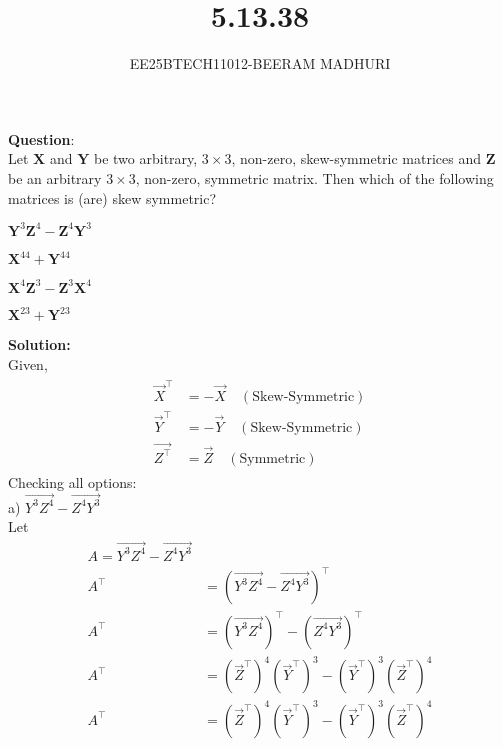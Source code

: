 \documentclass[journal]{IEEEtran}
\begin{document}

\vspace{3cm}

\title{5.13.38}
\author{EE25BTECH11012-BEERAM MADHURI}
{\let\newpage\relax\maketitle}

\renewcommand{\thefigure}{\theenumi}
\renewcommand{\thetable}{\theenumi}
\setlength{\intextsep}{10pt} %


\renewcommand{\thetable}{\theenumi}


\textbf{Question}:\\
Let $\mathbf{X}$ and $\mathbf{Y}$ be two arbitrary, $3 \times 3$, non-zero, skew-symmetric matrices and $\mathbf{Z}$ be an arbitrary $3 \times 3$, non-zero, symmetric matrix. Then which of the following matrices is (are) skew symmetric?

\begin{enumerate}
\begin{multicols}{4}
    \item $\mathbf{Y}^3 \mathbf{Z}^4 - \mathbf{Z}^4 \mathbf{Y}^3$
    \item $\mathbf{X}^{44} + \mathbf{Y}^{44}$
    \item $\mathbf{X}^4 \mathbf{Z}^3 - \mathbf{Z}^3 \mathbf{X}^4$
    \item $\mathbf{X}^{23} + \mathbf{Y}^{23}$
\end{multicols}
\end{enumerate}

\textbf{Solution:}\\
Given,
\begin{align}
\begin{aligned}\vec{X}^\top &= -\vec{X} \quad (\text{Skew-Symmetric}) \\\vec{Y}^\top &= -\vec{Y} \quad (\text{Skew-Symmetric}) \\\vec{Z^\top} &= \vec{Z} \quad (\text{Symmetric})\end{aligned}
\end{align}
Checking all options:\\
a) $\vec{Y^3 Z^4} - \vec{Z^4 Y^3}$\\
Let 
\begin{align}
A = \vec{Y^3 Z^4} - \vec{Z^4 Y^3}\\
A^\top &= (\vec{Y^3 Z^4} - \vec{Z^4 Y^3})^\top \\
A^\top &= (\vec{Y^3 Z^4})^\top - (\vec{Z^4 Y^3})^\top \\
A^\top &= (\vec{Z}^\top)^4 (\vec{Y}^\top)^3 - (\vec{Y}^\top)^3 (\vec{Z}^\top)^4 \\
A^\top &= (\vec{Z}^\top)^4 (\vec{Y}^\top)^3 - (\vec{Y}^\top)^3 (\vec{Z}^\top)^4\end{align}
\end{document}
